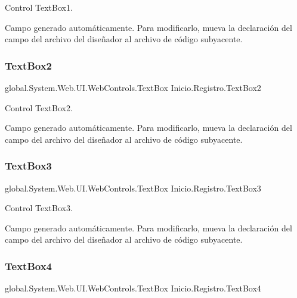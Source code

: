 Control Text\+Box1. 

Campo generado automáticamente. Para modificarlo, mueva la declaración del campo del archivo del diseñador al archivo de código subyacente. \mbox{\label{classInicio_1_1Registro_a24be4248d4791f6b323568f814f5e5c2}} 
\subsubsection{\texorpdfstring{TextBox2}{TextBox2}}
{\footnotesize\ttfamily global.\+System.\+Web.\+U\+I.\+Web\+Controls.\+Text\+Box Inicio.\+Registro.\+Text\+Box2\hspace{0.3cm}{\ttfamily [protected]}}



Control Text\+Box2. 

Campo generado automáticamente. Para modificarlo, mueva la declaración del campo del archivo del diseñador al archivo de código subyacente. \mbox{\label{classInicio_1_1Registro_adc45c7cdfd1ee0e80f517f1bb9e827ff}} 
\subsubsection{\texorpdfstring{TextBox3}{TextBox3}}
{\footnotesize\ttfamily global.\+System.\+Web.\+U\+I.\+Web\+Controls.\+Text\+Box Inicio.\+Registro.\+Text\+Box3\hspace{0.3cm}{\ttfamily [protected]}}



Control Text\+Box3. 

Campo generado automáticamente. Para modificarlo, mueva la declaración del campo del archivo del diseñador al archivo de código subyacente. \mbox{\label{classInicio_1_1Registro_a835108d17c8690d089f9ee129b2ff7f3}} 
\subsubsection{\texorpdfstring{TextBox4}{TextBox4}}
{\footnotesize\ttfamily global.\+System.\+Web.\+U\+I.\+Web\+Controls.\+Text\+Box Inicio.\+Registro.\+Text\+Box4\hspace{0.3cm}{\ttfamily [protected]}}



